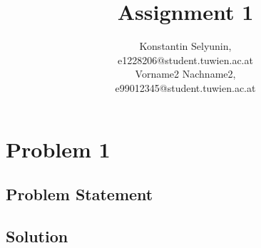 \documentclass[12pt,a4paper,titlepage,oneside]{article}
\title{Assignment 1}
\author{Konstantin Selyunin, \matrnr 1228206   \\
         {\small e1228206@student.tuwien.ac.at} \\
        Vorname2 Nachname2, \matrnr 99012345 \\
         {\small e99012345@student.tuwien.ac.at}
}
\begin{document}
\maketitle


\section{Problem 1}

\subsection{Problem Statement}


\subsection{Solution}
\end{document}
